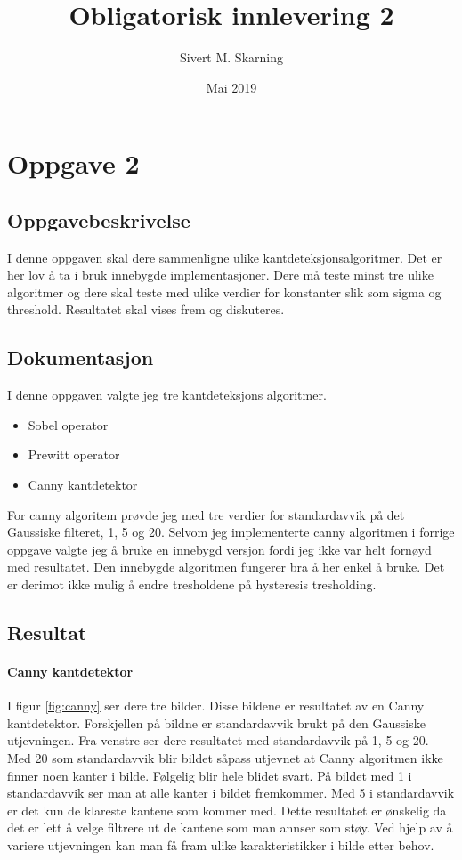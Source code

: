 \documentclass[a4paper, 12pt]{article}
\title{Obligatorisk innlevering 2}
\author{Sivert M. Skarning}
\date{Mai 2019}
\begin{document}
\maketitle

\section{Oppgave 2}
\subsection{Oppgavebeskrivelse}
I denne oppgaven skal dere sammenligne ulike kantdeteksjonsalgoritmer. Det er her lov å ta i bruk innebygde implementasjoner. Dere må teste minst tre ulike algoritmer og dere skal teste med ulike verdier for konstanter slik som sigma og threshold. Resultatet skal vises frem og diskuteres.

\subsection{Dokumentasjon}
I denne oppgaven valgte jeg tre kantdeteksjons algoritmer.
\begin{itemize}
\item Sobel operator
\item Prewitt operator
\item Canny kantdetektor
\end{itemize}

For canny algoritem prøvde jeg med tre verdier for standardavvik på det Gaussiske filteret, 1, 5 og 20. Selvom jeg implementerte canny algoritmen i forrige oppgave valgte jeg å bruke en innebygd versjon fordi jeg ikke var helt fornøyd med resultatet. Den innebygde algoritmen fungerer bra å her enkel å bruke. Det er derimot ikke mulig å endre tresholdene på hysteresis tresholding.

\subsection{Resultat}
\paragraph{Canny kantdetektor}I figur \ref{fig:canny} ser dere tre bilder. Disse bildene er resultatet av en Canny kantdetektor. Forskjellen på bildne er standardavvik brukt på den Gaussiske utjevningen. Fra venstre ser dere resultatet med standardavvik på 1, 5 og 20. Med 20 som standardavvik blir bildet såpass utjevnet at Canny algoritmen ikke finner noen kanter i bilde. Følgelig blir hele blidet svart. På bildet med 1 i standardavvik ser man at alle kanter i bildet fremkommer. Med 5 i standardavvik er det kun de klareste kantene som kommer med. Dette resultatet er ønskelig da det er lett å velge filtrere ut de kantene som man annser som støy. Ved hjelp av å variere utjevningen kan man få fram ulike karakteristikker i bilde etter behov.
\end{document}
